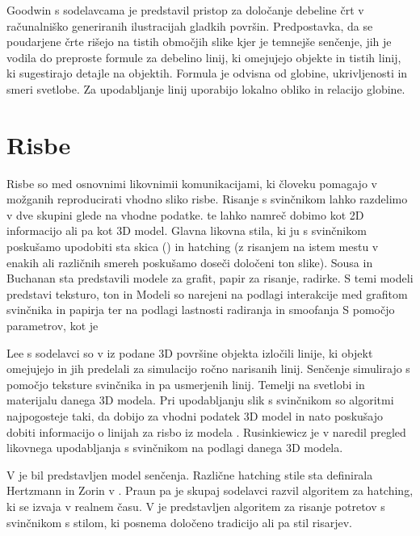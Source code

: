 Goodwin \cite{Goodwin:IsophoteDistance} s sodelavcama je predstavil pristop za določanje debeline črt v računalniško generiranih ilustracijah gladkih površin. Predpostavka, da se poudarjene črte rišejo na tistih območjih slike kjer je temnejše senčenje, jih je vodila do preproste formule za debelino linij, ki omejujejo objekte in tistih linij, ki sugestirajo detajle na objektih. Formula je odvisna od globine, ukrivljenosti in smeri svetlobe. Za upodabljanje linij uporabijo lokalno obliko in relacijo globine.

\section{Risbe}
Risbe so med osnovnimi likovnimii komunikacijami, ki človeku pomagajo v možganih reproducirati vhodno sliko risbe. Risanje s svinčnikom lahko razdelimo v dve skupini glede na vhodne podatke. te lahko namreč dobimo kot 2D informacijo ali pa kot 3D model. Glavna likovna stila, ki ju s svinčnikom poskušamo upodobiti sta skica ()%
in hatching (z risanjem na istem mestu v enakih ali različnih smereh poskušamo doseči določeni ton slike). %
Sousa in Buchanan \cite{Sousa:Model} sta predstavili modele za grafit, papir za risanje, radirke. S temi modeli predstavi  teksturo, ton in %
Modeli so narejeni na podlagi interakcije med grafitom svinčnika in papirja ter na podlagi lastnosti radiranja in smoofanja %
S pomočjo parametrov, kot je %

Lee s sodelavci so v \cite{Lee:RealTime} iz podane 3D površine objekta izločili linije, ki objekt omejujejo in jih predelali za simulacijo ročno narisanih linij. Senčenje simulirajo s pomočjo teksture svinčnika in pa usmerjenih linij. Temelji na svetlobi in materijalu danega 3D modela. Pri upodabljanju slik s svinčnikom so algoritmi najpogosteje taki, da dobijo za vhodni podatek 3D model in nato poskušajo dobiti informacijo o linijah za risbo iz modela \cite{DeCarlo:Photographs, Judd:Ridges, Lee:Abstracted, Grabli:Programmable}. Rusinkiewicz je v \cite{Rusinkiewicz:Review} naredil pregled likovnega upodabljanja s svinčnikom na podlagi danega 3D modela.

V \cite{Lake:Stylized} je bil predstavljen model senčenja. Različne hatching stile sta definirala Hertzmann in Zorin v \cite{Hertzmann:Illustrating}. Praun pa je skupaj sodelavci \cite{Praun:ReaTime} razvil algoritem za hatching, ki se izvaja v realnem času. V \cite{Chen:Example} je predstavljen algoritem za risanje potretov s svinčnikom s stilom, ki posnema določeno tradicijo ali pa stil risarjev.

